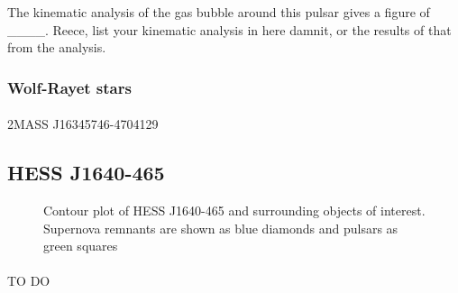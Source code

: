 \documentclass[a4paper, titlepage, oneside]{article}
\begin{document}
\begin{multicols}{2}
The kinematic analysis of the gas bubble around this pulsar gives a figure of \_\_\_\_. Reece, list your kinematic analysis in here damnit, or the results of that from the analysis.

\subsubsection{Wolf-Rayet stars}
\paragraph{}
2MASS J16345746-4704129

\subsection{HESS J1640-465}

\begin{figure}[H]
  \centering
  \caption{Contour plot of HESS J1640-465 and surrounding objects of interest. Supernova remnants are shown as blue diamonds and pulsars as green squares}
  \label{fig:hess40}
\end{figure}

\paragraph{}
TO DO


\end{multicols}
\end{document}
